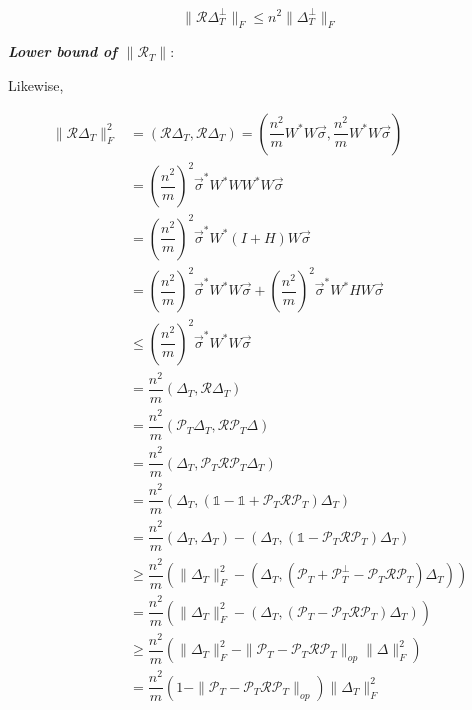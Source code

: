 \documentclass{article}
\begin{document}
{\color{blue}\begin{equation}
\|\mathcal{R}\Delta_T^\perp\|_F \le n^2 \|\Delta_T^\perp\|_F
\label{eq:18}
\end{equation}}

\textit{\textbf{Lower bound of $\|\mathcal{R}_T\|$}}:

Likewise,

\begin{equation}
\begin{aligned}
\|\mathcal{R}\Delta_T\|_F^2 
& = (\mathcal{R}\Delta_T,\mathcal{R}\Delta_T)
= (\dfrac{n^2}{m}W^*W\overrightarrow{\sigma},\dfrac{n^2}{m}W^*W\overrightarrow{\sigma})\\
& = \left(\dfrac{n^2}{m}\right)^2\overrightarrow{\sigma}^*W^*WW^*W\overrightarrow{\sigma}\\
&=\left(\dfrac{n^2}{m}\right)^2\overrightarrow{\sigma}^*W^*(I+H)W\overrightarrow{\sigma} \\
&= \left(\dfrac{n^2}{m}\right)^2\overrightarrow{\sigma}^*W^*W\overrightarrow{\sigma}+ \left(\dfrac{n^2}{m}\right)^2\overrightarrow{\sigma}^*W^*HW\overrightarrow{\sigma}\\
& \le \left(\dfrac{n^2}{m}\right)^2\overrightarrow{\sigma}^*W^*W\overrightarrow{\sigma}\\
& = \dfrac{n^2}{m}(\Delta_T,\mathcal{R}\Delta_T)\\
&= \dfrac{n^2}{m}(\mathcal{P}_T \Delta_T, \mathcal{R}\mathcal{P}_T \Delta)\\
& = \dfrac{n^2}{m}(\Delta_T,\mathcal{P}_T\mathcal{R}\mathcal{P}_T\Delta_T)\\
& = \dfrac{n^2}{m}(\Delta_T,(\mathbb{1}-\mathbb{1}+\mathcal{P}_T\mathcal{R}\mathcal{P}_T)\Delta_T)\\
&=\dfrac{n^2}{m}(\Delta_T,\Delta_T)-(\Delta_T,(\mathbb{1}-\mathcal{P}_T\mathcal{R}\mathcal{P}_T)\Delta_T)\\
& \ge \dfrac{n^2}{m}(\|\Delta_T\|_F^2 -(\Delta_T,(\mathcal{P}_T+\mathcal{P}_T^\perp-\mathcal{P}_T\mathcal{R}\mathcal{P}_T)\Delta_T)    )\\
&=\dfrac{n^2}{m}(\|\Delta_T\|_F^2 -(\Delta_T,(\mathcal{P}_T-\mathcal{P}_T\mathcal{R}\mathcal{P}_T)\Delta_T)    )\\
&\ge \dfrac{n^2}{m}(\|\Delta_T\|_F^2-\|\mathcal{P}_T-\mathcal{P}_T\mathcal{R}\mathcal{P}_T\|_{op}\|\Delta\|_F^2)\\
& = \dfrac{n^2}{m}(1- \|\mathcal{P}_T-\mathcal{P}_T\mathcal{R}\mathcal{P}_T\|_{op})\|\Delta_T\|_F^2
\end{aligned}
\label{eq:19}
\end{equation}
\end{document}

